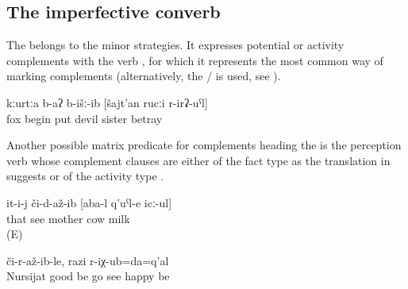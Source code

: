 \subsection{The imperfective converb}
\label{ssec:The imperfective converb}

The  belongs to the minor  strategies. It expresses potential or activity complements with the verb , for which it represents the most common way of marking complements  (alternatively, the \slash {} is used, see ).
%
\begin{exe}
	\ex	\label{ex:‎‎‎The fox began betraying / to betray the devil sister}
	\gll	kːurtːa	b-aʔ	b-išː-ib	[šajt'an	rucːi	r-irʡ-uˁl]\\
		fox	begin	put	devil	sister	betray	\\
	\glt	{}
\end{exe}

Another possible matrix predicate for complements heading the  is the perception verb  whose complement clauses are either of the fact type as the translation in  suggests or of the activity type . 
%
\begin{exe}

	\ex	\label{ex:‎S/he saw that mother milked the cows}
	\gll	it-i-j	či-d-až-ib	[aba-l	q'uˁl-e	icː-ul]\\
		that	see	mother	cow		milk\\
	\glt	{} (E)
	
	\ex	\label{ex:‎I got happy when I saw that Nursijat recovered and is (already) walking around}
		či-r-až-ib-le,	razi	r-iχ-ub=da=q'al\\
		Nursijat	good	be	go	see	happy	be\\
	\glt	{}

\end{exe}


